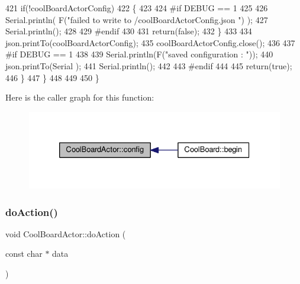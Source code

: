 \begin{DoxyCode}
421             \textcolor{keywordflow}{if}(!coolBoardActorConfig)
422             \{
423             
424 \textcolor{preprocessor}{            #if DEBUG == 1 }
425 
426                 Serial.println( F(\textcolor{stringliteral}{"failed to write to /coolBoardActorConfig.json "}) );
427                 Serial.println();
428             
429 \textcolor{preprocessor}{            #endif}
430                 
431                 \textcolor{keywordflow}{return}(\textcolor{keyword}{false});          
432             \}  
433 
434             json.printTo(coolBoardActorConfig);
435             coolBoardActorConfig.close();
436 
437 \textcolor{preprocessor}{        #if DEBUG == 1 }
438             
439             Serial.println(F(\textcolor{stringliteral}{"saved configuration : "}));
440             json.printTo(Serial );
441             Serial.println();       
442         
443 \textcolor{preprocessor}{        #endif}
444 
445             \textcolor{keywordflow}{return}(\textcolor{keyword}{true}); 
446         \}
447     \}   
448     
449 
450 \}
\end{DoxyCode}
Here is the caller graph for this function\+:\nopagebreak
\begin{figure}[H]
\begin{center}
\leavevmode
\includegraphics[width=326pt]{dc/d69/class_cool_board_actor_a5af5538fc7d169f63127e06d5219bcd4_icgraph}
\end{center}
\end{figure}
\mbox{\label{class_cool_board_actor_a96a45658d32c6b95caa2f385c7da32cd}} 
\subsubsection{\texorpdfstring{do\+Action()}{doAction()}}
{\footnotesize\ttfamily void Cool\+Board\+Actor\+::do\+Action (\begin{DoxyParamCaption}\item[{const char $\ast$}]{data }\end{DoxyParamCaption})}

